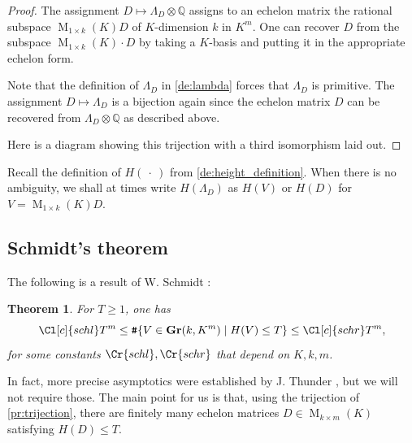 \documentclass{amsart}
\newtheorem{theorem}{Theorem}
\theoremstyle{definition}
\theoremstyle{remark}
\newcommand{\OK}{\mathcal{O}_K}
\DeclareMathOperator{\M}{M}
\DeclareMathOperator{\card}{\texttt{\#}}
\DeclareMathOperator{\Gr}{\mathbf{Gr}}
\begin{document}
\begin{proof}
    The assignment $D \mapsto \Lambda_D \otimes \mathbb{Q}$ 
    assigns to an echelon matrix the rational subspace $ \M_{1 \times k}(K)D$ of $K$-dimension $k$ in $K^{m}$. One can recover $D$ from the subspace
    $\M_{1 \times k}(K) \cdot D$ by taking a $K$-basis and putting it in the appropriate echelon form.


    Note that the definition of $\Lambda_{D}$ in \cref{de:lambda} forces that $\Lambda_{D}$ is primitive. 
    The assignment $D \mapsto \Lambda_D$ is a bijection again since the echelon matrix $D$ can be recovered from $\Lambda_{D} \otimes \mathbb{Q}$ as described above.

    Here is a diagram showing this trijection with a third isomorphism laid out.

    \hspace{-0.45cm}

\end{proof}


Recall the definition of $H(~\cdot~)$ from \cref{de:height_definition}.
When there is no ambiguity, we shall at times write $H(\Lambda_D)$ as $H(V)$ or $H(D)$ for $V=\M_{1 \times k}(K) D$.  

\subsection{Schmidt's theorem}
The following is a result of W. Schmidt \cite{S1967}:
\begin{theorem}
    \label{th:schmidt}
    For $T \geq 1$, one has
    \begin{equation}
        \Cl[c]{schl}T^{m} \leq \card \{ V \in \Gr(k,K^{m}) \mid H(V) \leq T \} \leq \Cl[c]{schr} T^{m},
    \end{equation}
    for some constants $\Cr{schl},\Cr{schr}$ that depend on $K,k,m$.
\end{theorem}
In fact, more precise asymptotics were established by J. Thunder \cite{T1992}, but we will not require those.
The main point for us is that, using the trijection of \cref{pr:trijection}, there are finitely many echelon matrices $D\in \M_{k \times m}(K)$ satisfying $H(D) \leq T$.
\end{document}
